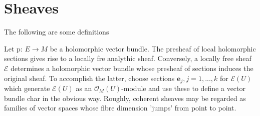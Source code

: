 \section{Sheaves}
The following are some definitions 
\begin{example}
 Let p: $E \to M$ be a holomorphic vector bundle. The presheaf of local holomorphic sections gives rise to a locally fre analythic sheaf. 
Conversely, a locally free sheaf $\mathcal{E}$ determines a holomorphic vector bundle whose presheaf
of sections induces the original sheaf. To accomplish the latter, choose sections $\mathbf{e}_j,j=1,...,k$ for 
$\mathcal{E}(U)$ which generate $\mathcal{E}(U)$ as an $\mathcal{O}_M(U)$-module and use these to define a vector bundle 
char in the obvious way.
    Roughly, coherent sheaves may be regarded as families of vector spaces whose fibre dimension 'jumps' from point to point.

\end{example}
